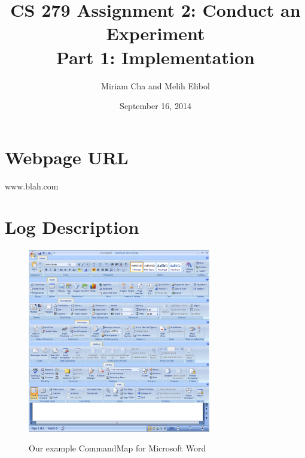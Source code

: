 \documentclass{article}
\title{CS 279 Assignment 2: Conduct an Experiment\\Part 1: Implementation}
\author{Miriam Cha and Melih Elibol}
\date{September 16, 2014}
\begin{document}
\maketitle

\section*{Webpage URL}
 www.blah.com
\section*{Log Description} 

\begin{figure}
  \centering
  \includegraphics[width=80mm]{command_layout1}\\
  \caption{Our example CommandMap for Microsoft Word}
  \label{fig:ex_commandmap}
\end{figure}
\end{document}
